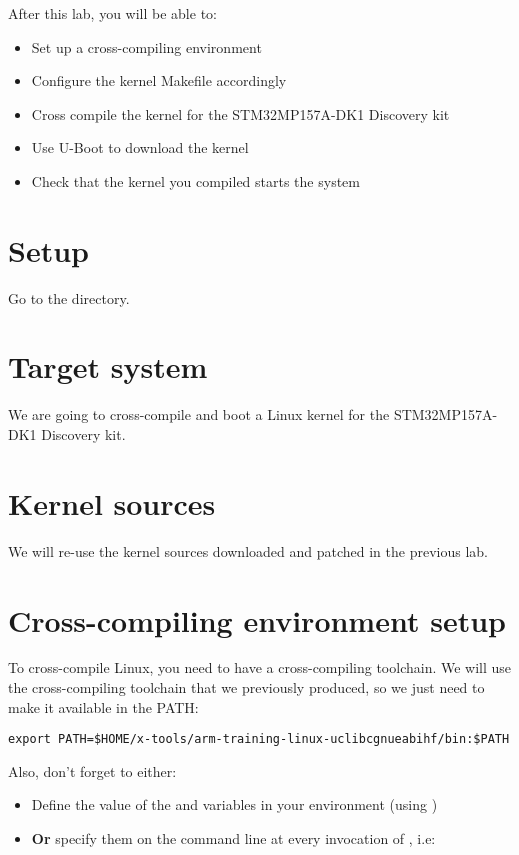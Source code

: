 
After this lab, you will be able to:
\begin{itemize}
\item Set up a cross-compiling environment
\item Configure the kernel Makefile accordingly
\item Cross compile the kernel for the STM32MP157A-DK1 Discovery kit
\item Use U-Boot to download the kernel
\item Check that the kernel you compiled starts the system
\end{itemize}

\section{Setup}

Go to the  directory.

\section{Target system}

We are going to cross-compile and boot a Linux kernel for the
STM32MP157A-DK1 Discovery kit.

\section{Kernel sources}

We will re-use the kernel sources downloaded and patched in the
previous lab.

\section{Cross-compiling environment setup}

To cross-compile Linux, you need to have a cross-compiling
toolchain. We will use the cross-compiling toolchain that we
previously produced, so we just need to make it available in the PATH:

\begin{verbatim}
export PATH=$HOME/x-tools/arm-training-linux-uclibcgnueabihf/bin:$PATH
\end{verbatim}

Also, don't forget to either:

\begin{itemize}
\item Define the value of the  and 
  variables in your environment (using )
\item {\bf Or} specify them on the command line at every invocation of
  , i.e: 
\end{itemize}

